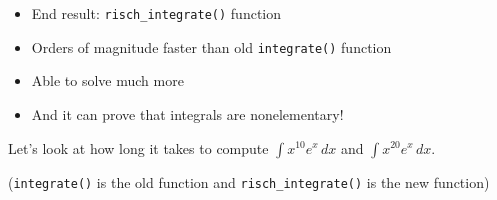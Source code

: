 \documentclass{beamer}
\numberwithin{equation}{section} %
\newcommand{\rischintegrate}{\texttt{risch\_integrate()}}
\begin{document}
\begin{frame}
    \begin{itemize}
        \item End result: \rischintegrate{} function
        \item Orders of magnitude faster than old \texttt{integrate()} function
        \item Able to solve much more
        \item And it can prove that integrals are nonelementary!
    \end{itemize}
\end{frame}

\begin{frame}
    \begin{figure}
    \begin{flushleft}
    \end{flushleft}
    \end{figure}
\end{frame}

\begin{frame}
    \begin{figure}
    \begin{flushleft}
    \end{flushleft}
    \end{figure}
\end{frame}

\begin{frame}
    Let's look at how long it takes to compute $\int{x^{10}e^x\,dx}$ and $\int{x^{20}e^x\,dx}$.
    \begin{figure}
    \begin{flushleft}
    \end{flushleft}
    \end{figure}
    (\texttt{integrate()} is the old function and \rischintegrate{} is
    the new function)
\end{frame}
\end{document}
